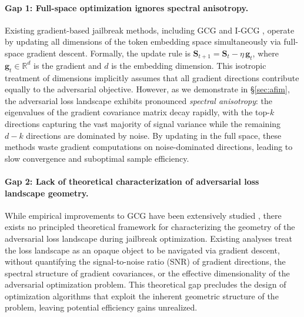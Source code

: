 ﻿\documentclass[lettersize,journal]{IEEEtran}
\begin{document}
\paragraph{Gap 1: Full-space optimization ignores spectral anisotropy.} Existing gradient-based jailbreak methods, including GCG \cite{zou2023universal} and I-GCG \cite{jia2024improved}, operate by updating all dimensions of the token embedding space simultaneously via full-space gradient descent. Formally, the update rule is $\mathbf{S}_{t+1} = \mathbf{S}_t - \eta \, \mathbf{g}_t$, where $\mathbf{g}_t \in \mathbb{R}^d$ is the gradient and $d$ is the embedding dimension. This isotropic treatment of dimensions implicitly assumes that all gradient directions contribute equally to the adversarial objective. However, as we demonstrate in \S\ref{sec:afim}, the adversarial loss landscape exhibits pronounced \textit{spectral anisotropy}: the eigenvalues of the gradient covariance matrix decay rapidly, with the top-$k$ directions capturing the vast majority of signal variance while the remaining $d-k$ directions are dominated by noise. By updating in the full space, these methods waste gradient computations on noise-dominated directions, leading to slow convergence and suboptimal sample efficiency.

\paragraph{Gap 2: Lack of theoretical characterization of adversarial loss landscape geometry.} While empirical improvements to GCG have been extensively studied \cite{jia2024improved, zhu2023autodan, ren2024drattack}, there exists no principled theoretical framework for characterizing the geometry of the adversarial loss landscape during jailbreak optimization. Existing analyses treat the loss landscape as an opaque object to be navigated via gradient descent, without quantifying the signal-to-noise ratio (SNR) of gradient directions, the spectral structure of gradient covariances, or the effective dimensionality of the adversarial optimization problem. This theoretical gap precludes the design of optimization algorithms that exploit the inherent geometric structure of the problem, leaving potential efficiency gains unrealized.
\end{document}
